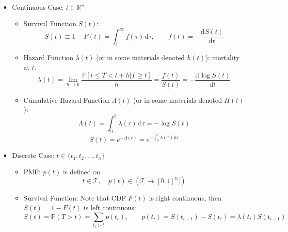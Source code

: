 \begin{itemize}[topsep=2pt,itemsep=0pt]
    \item Continuous Case: $ t\in \mathbb{R}^+ $
    \begin{itemize}[topsep=2pt,itemsep=0pt]
        \item Survival Function $ S(t) $:
        \begin{equation}
            S(t)\equiv 1-F(t) =\int _t^\infty f(\tau) \,\mathrm{d}\tau,\qquad f(t)=-\dfrac{\mathrm{d}^{} S(t)}{\mathrm{d}t^{}}
        \end{equation}
        
        \item Hazard Function $ \lambda (t) $ (or in some materials denoted $ h(t) $): mortality at $ t $:
        \begin{equation}
            \lambda (t)=\lim_{h\to 0}\dfrac{\mathbb{P}[t\leq T<t+h|T\geq t]}{h}= \dfrac{f(t)}{S(t)}=-\dfrac{\mathrm{d}^{} \log S(t)}{\mathrm{d}t^{}}
        \end{equation}
        \item Cumulative Hazard Function $ \Lambda (t) $ (or in some materials denoted $ H(t) $):
        \begin{equation}
            \Lambda (t)=\int _0^t \lambda (\tau) \,\mathrm{d}\tau =-\log S(t)
        \end{equation}
        \begin{equation}
            S(t)=e^{-\Lambda (t)}=e^{-\int _0^t \lambda (\tau) \,\mathrm{d}\tau} 
        \end{equation}
        
    \end{itemize}
    \item Discrete Case: $ t\in \{t_1,t_2,\ldots,t_n\} $
    \begin{itemize}[topsep=2pt,itemsep=0pt]
        \item PMF: $ p(t) $ is defined on 
        \begin{equation}
            t\in\mathcal{T},\quad p(t)\in (\mathcal{T}\to [0,1]^n]) 
        \end{equation}
        \item Survival Function: Note that CDF $ F(t) $ is right continuous, then $ S(t) =1-F(t)$ is left continuous:
        \begin{equation}
            S(t)=\mathbb{P}(T>t)=\sum_{t_i>t} p(t_i),\qquad p(t_i)=S(t_{i-1})-S(t_i)=\lambda (t_i)S(t_{i-1})
        \end{equation}
        

\end{itemize}
\end{itemize}
